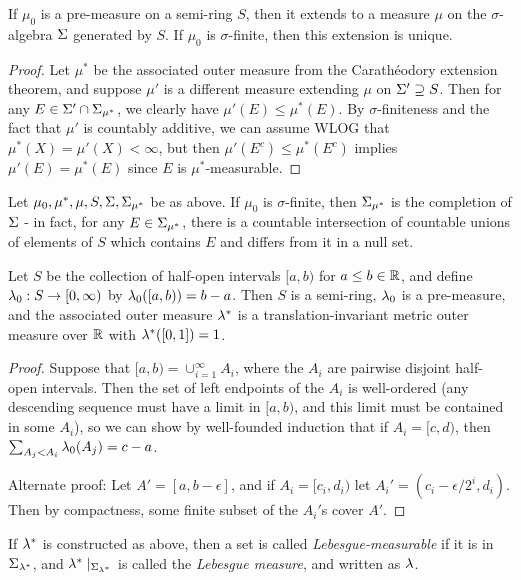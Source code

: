 \documentclass[letterpaper,11pt]{report}
\begin{document}
\begin{thm} If $\mu_0$ is a pre-measure on a semi-ring $S$, then it extends to a measure $\mu$ on the $\sigma$-algebra $\Sigma$ generated by $S$. If $\mu_0$ is $\sigma$-finite, then this extension is unique.
\end{thm}
\begin{proof} Let $\mu^*$ be the associated outer measure from the Carath\'eodory extension theorem, and suppose $\mu'$ is a different measure extending $\mu$ on $\Sigma' \supseteq S$. Then for any $E \in \Sigma' \cap \Sigma_{\mu^*}$, we clearly have $\mu'(E) \le \mu^*(E)$. By $\sigma$-finiteness and the fact that $\mu'$ is countably additive, we can assume WLOG that $\mu^*(X) = \mu'(X) < \infty$, but then $\mu'(E^c) \le \mu^*(E^c)$ implies $\mu'(E) = \mu^*(E)$ since $E$ is $\mu^*$-measurable.
\end{proof}

\begin{prop} Let $\mu_0, \mu^*, \mu, S, \Sigma, \Sigma_{\mu^*}$ be as above. If $\mu_0$ is $\sigma$-finite, then $\Sigma_{\mu^*}$ is the completion of $\Sigma$ - in fact, for any $E \in \Sigma_{\mu^*}$, there is a countable intersection of countable unions of elements of $S$ which contains $E$ and differs from it in a null set.
\end{prop}

\begin{thm} Let $S$ be the collection of half-open intervals $[a,b)$ for $a \le b \in \mathbb{R}$, and define $\lambda_0 : S \rightarrow [0,\infty)$ by $\lambda_0([a,b)) = b-a$. Then $S$ is a semi-ring, $\lambda_0$ is a pre-measure, and the associated outer measure $\lambda^*$ is a translation-invariant metric outer measure over $\mathbb{R}$ with $\lambda^*([0,1]) = 1$.
\end{thm}
\begin{proof} Suppose that $[a,b) = \cup_{i=1}^\infty A_i$, where the $A_i$ are pairwise disjoint half-open intervals. Then the set of left endpoints of the $A_i$ is well-ordered (any descending sequence must have a limit in $[a,b)$, and this limit must be contained in some $A_i$), so we can show by well-founded induction that if $A_i = [c,d)$, then $\sum_{A_j < A_i} \lambda_0(A_j) = c-a$.

Alternate proof: Let $A' = [a,b-\epsilon]$, and if $A_i = [c_i,d_i)$ let $A_i' = (c_i - \epsilon/2^i, d_i)$. Then by compactness, some finite subset of the $A_i'$s cover $A'$.
\end{proof}

\begin{defn} If $\lambda^*$ is constructed as above, then a set is called \emph{Lebesgue-measurable} if it is in $\Sigma_{\lambda^*}$, and $\lambda^*\mid_{\Sigma_{\lambda^*}}$ is called the \emph{Lebesgue measure}, and written as $\lambda$.
\end{defn}
\end{document}
